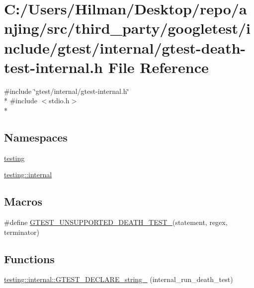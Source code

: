 \hypertarget{gtest-death-test-internal_8h}{}\section{C\+:/\+Users/\+Hilman/\+Desktop/repo/anjing/src/third\+\_\+party/googletest/include/gtest/internal/gtest-\/death-\/test-\/internal.h File Reference}
\label{gtest-death-test-internal_8h}
{\ttfamily \#include \char`\"{}gtest/internal/gtest-\/internal.\+h\char`\"{}}\\*
{\ttfamily \#include $<$stdio.\+h$>$}\\*
\subsection*{Namespaces}
\begin{DoxyCompactItemize}
\item 
 \hyperlink{namespacetesting}{testing}
\item 
 \hyperlink{namespacetesting_1_1internal}{testing\+::internal}
\end{DoxyCompactItemize}
\subsection*{Macros}
\begin{DoxyCompactItemize}
\item 
\#define \hyperlink{gtest-death-test-internal_8h_a29a145cda8bd2d0c6a78b0ac1d670d18}{G\+T\+E\+S\+T\+\_\+\+U\+N\+S\+U\+P\+P\+O\+R\+T\+E\+D\+\_\+\+D\+E\+A\+T\+H\+\_\+\+T\+E\+S\+T\+\_\+}(statement,  regex,  terminator)
\end{DoxyCompactItemize}
\subsection*{Functions}
\begin{DoxyCompactItemize}
\item 
\hyperlink{namespacetesting_1_1internal_ac20f635c3285878fc1195ce687f23950}{testing\+::internal\+::\+G\+T\+E\+S\+T\+\_\+\+D\+E\+C\+L\+A\+R\+E\+\_\+string\+\_\+} (internal\+\_\+run\+\_\+death\+\_\+test)
\end{DoxyCompactItemize}
